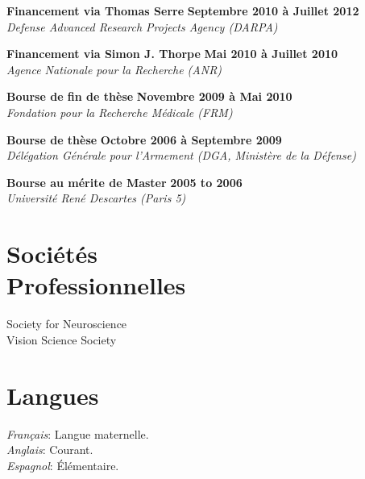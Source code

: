 \documentclass[margin,line]{resume}
\begin{document}
\begin{resume}
	\vspace{-2mm} 
	\textbf{Financement via Thomas Serre} \hfill \textbf{Septembre 2010 à Juillet 2012}\\
	\textsl{Defense Advanced Research Projects Agency (DARPA)}

	\vspace{-2mm} 
	\textbf{Financement via Simon J. Thorpe} \hfill \textbf{Mai 2010 à Juillet 2010}\\
	\textsl{Agence Nationale pour la Recherche (ANR)}
		
	\vspace{-2mm} 
	\textbf{Bourse de fin de thèse} \hfill \textbf{Novembre 2009 à Mai 2010}\\
	\textsl{Fondation pour la Recherche Médicale (FRM)}
		
	\vspace{-2mm} 
	\textbf{Bourse de thèse} \hfill \textbf{Octobre 2006 à Septembre 2009}\\ %
	\textsl{Délégation Générale pour l'Armement (DGA, Ministère de la Défense)}
	
	\vspace{-2mm} 
	\textbf{Bourse au mérite  de Master} \hfill \textbf{2005 to 2006}\\
	\textsl{Université René Descartes (Paris 5)}	



\vspace{3mm}
\section{\mysidestyle Sociétés\\Professionnelles}
	Society for Neuroscience\\
	Vision Science Society

	
\vspace{3mm}
\section{\mysidestyle Langues}
	\textsl{Français}: Langue maternelle.\\
	\textsl{Anglais}: Courant.\\
	\textsl{Espagnol}: \'Elémentaire.


\vspace{3mm}

\end{resume}
\end{document}
